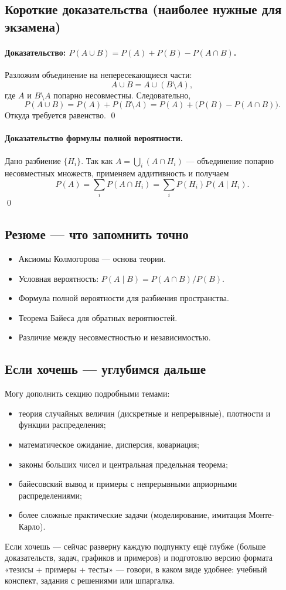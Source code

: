 \subsection{Короткие доказательства (наиболее нужные для экзамена)}
\paragraph{Доказательство: $P(A\cup B)=P(A)+P(B)-P(A\cap B)$.}  
Разложим объединение на непересекающиеся части:
\[
A\cup B = A \cup (B\setminus A),
\]
где $A$ и $B\setminus A$ попарно несовместны. Следовательно,
\[
P(A\cup B) = P(A) + P(B\setminus A) = P(A) + \bigl(P(B) - P(A\cap B)\bigr).
\]
Откуда требуется равенство. \qed

\paragraph{Доказательство формулы полной вероятности.}  
Дано разбиение $\{H_i\}$. Так как $A = \bigcup_i (A\cap H_i)$ — объединение попарно несовместных множеств, применяем аддитивность и получаем
\[
P(A)=\sum_i P(A\cap H_i) = \sum_i P(H_i)P(A\mid H_i).
\]
\qed

\subsection{Резюме — что запомнить точно}
\begin{itemize}
  \item Аксиомы Колмогорова — основа теории.
  \item Условная вероятность: $P(A\mid B)=P(A\cap B)/P(B)$.
  \item Формула полной вероятности для разбиения пространства.
  \item Теорема Байеса для обратных вероятностей.
  \item Различие между несовместностью и независимостью.
\end{itemize}

\subsection{Если хочешь — углубимся дальше}
Могу дополнить секцию подробными темами:
\begin{itemize}
  \item теория случайных величин (дискретные и непрерывные), плотности и функции распределения;
  \item математическое ожидание, дисперсия, ковариация;
  \item законы больших чисел и центральная предельная теорема;
  \item байесовский вывод и примеры с непрерывными априорными распределениями;
  \item более сложные практические задачи (моделирование, имитация Монте-Карло).
\end{itemize}

\bigskip
Если хочешь — сейчас разверну каждую подпункту ещё глубже (больше доказательств, задач, графиков и примеров) и подготовлю версию формата «тезисы + примеры + тесты» — говори, в каком виде удобнее: учебный конспект, задания с решениями или шпаргалка.
